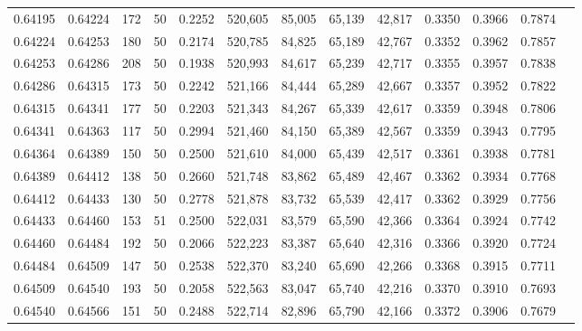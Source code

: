 \begin{tabular}{rrrrrrrrrrrrr}
0.64195 & 0.64224 &   172 &  50 &                                     0.2252 & 520,605 &  85,005 &  65,139 &  42,817 & 0.3350 & 0.3966 & 0.7874 \\
0.64224 & 0.64253 &   180 &  50 &                                     0.2174 & 520,785 &  84,825 &  65,189 &  42,767 & 0.3352 & 0.3962 & 0.7857 \\
0.64253 & 0.64286 &   208 &  50 &                                     0.1938 & 520,993 &  84,617 &  65,239 &  42,717 & 0.3355 & 0.3957 & 0.7838 \\
0.64286 & 0.64315 &   173 &  50 &                                     0.2242 & 521,166 &  84,444 &  65,289 &  42,667 & 0.3357 & 0.3952 & 0.7822 \\
0.64315 & 0.64341 &   177 &  50 &                                     0.2203 & 521,343 &  84,267 &  65,339 &  42,617 & 0.3359 & 0.3948 & 0.7806 \\
0.64341 & 0.64363 &   117 &  50 &                                     0.2994 & 521,460 &  84,150 &  65,389 &  42,567 & 0.3359 & 0.3943 & 0.7795 \\
0.64364 & 0.64389 &   150 &  50 &                                     0.2500 & 521,610 &  84,000 &  65,439 &  42,517 & 0.3361 & 0.3938 & 0.7781 \\
0.64389 & 0.64412 &   138 &  50 &                                     0.2660 & 521,748 &  83,862 &  65,489 &  42,467 & 0.3362 & 0.3934 & 0.7768 \\
0.64412 & 0.64433 &   130 &  50 &                                     0.2778 & 521,878 &  83,732 &  65,539 &  42,417 & 0.3362 & 0.3929 & 0.7756 \\
0.64433 & 0.64460 &   153 &  51 &                                     0.2500 & 522,031 &  83,579 &  65,590 &  42,366 & 0.3364 & 0.3924 & 0.7742 \\
0.64460 & 0.64484 &   192 &  50 &                                     0.2066 & 522,223 &  83,387 &  65,640 &  42,316 & 0.3366 & 0.3920 & 0.7724 \\
0.64484 & 0.64509 &   147 &  50 &                                     0.2538 & 522,370 &  83,240 &  65,690 &  42,266 & 0.3368 & 0.3915 & 0.7711 \\
0.64509 & 0.64540 &   193 &  50 &                                     0.2058 & 522,563 &  83,047 &  65,740 &  42,216 & 0.3370 & 0.3910 & 0.7693 \\
0.64540 & 0.64566 &   151 &  50 &                                     0.2488 & 522,714 &  82,896 &  65,790 &  42,166 & 0.3372 & 0.3906 & 0.7679 \\

\end{tabular}

